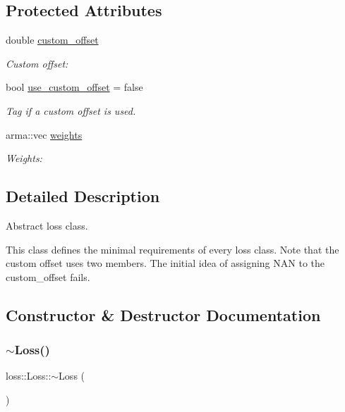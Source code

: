 \subsection*{Protected Attributes}
\begin{DoxyCompactItemize}
\item 
double \mbox{\hyperlink{classloss_1_1_loss_ae5dc373f54ed65ee0ca54a921ef826f4}{custom\+\_\+offset}}
\begin{DoxyCompactList}\small\item\em Custom offset\+: \end{DoxyCompactList}\item 
bool \mbox{\hyperlink{classloss_1_1_loss_a5fabbbb104e6f430498630130ac8a131}{use\+\_\+custom\+\_\+offset}} = false
\begin{DoxyCompactList}\small\item\em Tag if a custom offset is used. \end{DoxyCompactList}\item 
arma\+::vec \mbox{\hyperlink{classloss_1_1_loss_a4cfecaa4e3a6244ec82651607340e751}{weights}}
\begin{DoxyCompactList}\small\item\em Weights\+: \end{DoxyCompactList}\end{DoxyCompactItemize}


\subsection{Detailed Description}
Abstract loss class. 

This class defines the minimal requirements of every loss class. Note that the custom offset uses two members. The initial idea of assigning {\ttfamily N\+AN} to the {\ttfamily custom\+\_\+offset} fails. 

\subsection{Constructor \& Destructor Documentation}
\mbox{\label{classloss_1_1_loss_a868a7908fd97590b6c4fc69f4eb3c570}} 
\subsubsection{\texorpdfstring{$\sim$\+Loss()}{~Loss()}}
{\footnotesize\ttfamily loss\+::\+Loss\+::$\sim$\+Loss (\begin{DoxyParamCaption}{ }\end{DoxyParamCaption})\hspace{0.3cm}{\ttfamily [virtual]}}



